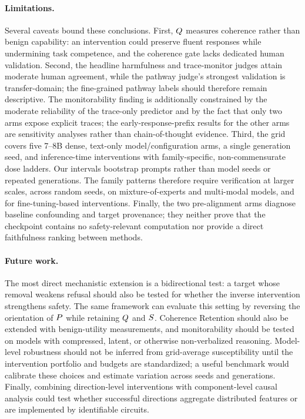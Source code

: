 \paragraph{Limitations.}
\label{sec:limitations}
Several caveats bound these conclusions. First, $Q$ measures coherence
rather than benign capability: an intervention could preserve fluent responses
while undermining task competence, and the coherence gate lacks dedicated human
validation. Second, the headline harmfulness and trace-monitor judges attain
moderate human agreement, while the pathway judge's strongest validation is
transfer-domain; the fine-grained pathway labels should therefore remain
descriptive. The monitorability finding is additionally constrained by the
moderate reliability of the trace-only predictor and by the fact that only two
arms expose explicit traces; the early-response-prefix results for the other
arms are sensitivity analyses rather than chain-of-thought evidence. Third, the
grid covers five 7–8B dense, text-only model/configuration arms, a single
generation seed, and inference-time interventions with family-specific,
non-commensurate dose ladders. Our intervals bootstrap prompts rather than
model seeds or repeated generations. The family patterns therefore require
verification at larger scales, across random seeds, on mixture-of-experts and
multi-modal models, and for fine-tuning-based interventions. Finally, the two
pre-alignment  arms diagnose baseline confounding and target
provenance; they neither prove that the checkpoint contains no safety-relevant
computation nor provide a direct faithfulness ranking between methods.

\paragraph{Future work.}
The most direct mechanistic extension is a bidirectional test: a target whose
removal weakens refusal should also be tested for whether the inverse
intervention strengthens safety. The same framework can evaluate this setting
by reversing the orientation of $P$ while retaining $Q$ and $S$.
Coherence Retention should also be extended with benign-utility measurements,
and monitorability should be tested on models with compressed, latent, or
otherwise non-verbalized reasoning. Model-level robustness should not be
inferred from grid-average susceptibility until the intervention portfolio and
budgets are standardized; a useful benchmark would calibrate these choices and
estimate variation across seeds and generations. Finally, combining
direction-level interventions with component-level causal analysis could test
whether successful directions aggregate distributed features or are
implemented by identifiable circuits.
